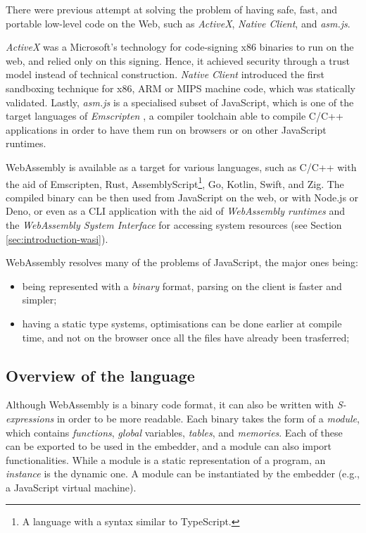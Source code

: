 There were previous attempt at solving the problem of having safe, fast, and portable low-level code on the Web,
such as \textit{ActiveX}, \textit{Native Client}, and \textit{asm.js}.

\textit{ActiveX} \cite{activex} was a Microsoft's technology for code-signing x86 binaries to run on the web, and relied only
on this signing. Hence, it achieved security through a trust model instead of technical construction.
\textit{Native Client} \cite{native-client} introduced the first sandboxing technique for x86, ARM or MIPS machine code,
which was statically validated. Lastly, \textit{asm.js} \cite{asmjs} is a specialised subset of JavaScript, which is one of the target
languages of \textit{Emscripten} \cite{emscripten}, a compiler toolchain able to compile C/C++ applications in order to have them
run on browsers or on other JavaScript runtimes.

WebAssembly is available as a target for various languages, such as C/C++ with the aid of Emscripten, Rust,
AssemblyScript\footnote{A language with a syntax similar to TypeScript.}, Go, Kotlin, Swift, and Zig.
The compiled binary can be then used from JavaScript on the web, or with Node.js or Deno, or even as a CLI application
with the aid of \textit{WebAssembly runtimes} and the \textit{WebAssembly System Interface}
for accessing system resources (see Section \ref*{sec:introduction-wasi}).

WebAssembly resolves many of the problems of JavaScript, the major ones being:
\begin{itemize}
  \item being represented with a \textit{binary} format, parsing on the client is faster and simpler;
  \item having a static type systems, optimisations can be done earlier at compile time, and not on the browser once all the files
        have already been trasferred;
\end{itemize}

\subsection{Overview of the language}

Although WebAssembly is a binary code format, it can also be written with \textit{S-expressions}
in order to be more readable.
Each binary takes the form of a \textit{module}, which contains \textit{functions}, \textit{global} variables,
\textit{tables}, and \textit{memories}. Each of these can be exported to be used in the embedder, and a module can also import functionalities.
While a module is a static representation of a program, an \textit{instance} is the dynamic one.
A module can be instantiated by the embedder (e.g., a JavaScript virtual machine).

